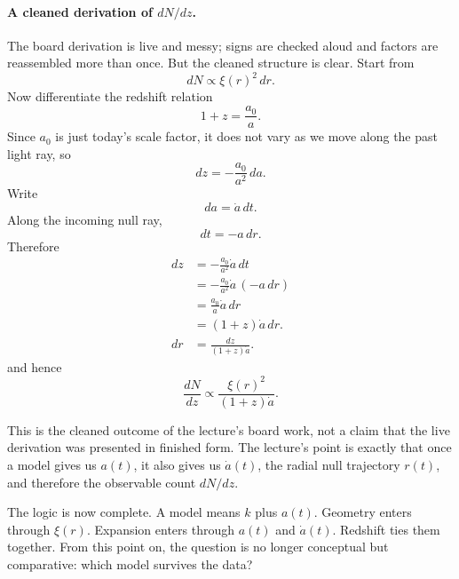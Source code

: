 \paragraph{A cleaned derivation of \(dN/dz\).}
The board derivation is live and messy; signs are checked aloud and factors are reassembled more than once. But the cleaned structure is clear. Start from
\begin{equation}
dN\propto \xi(r)^2\,dr.
\end{equation}
Now differentiate the redshift relation
\begin{equation}
1+z=\frac{a_0}{a}.
\end{equation}
Since \(a_0\) is just today's scale factor, it does not vary as we move along the past light ray, so
\begin{equation}
dz=-\frac{a_0}{a^2}\,da.
\end{equation}
Write
\begin{equation}
da=\dot a\,dt.
\end{equation}
Along the incoming null ray,
\begin{equation}
dt=-a\,dr.
\end{equation}
Therefore
\begin{align}
dz
&=
-\frac{a_0}{a^2}\dot a\,dt
\\
&=
-\frac{a_0}{a^2}\dot a\,(-a\,dr)
\\
&=
\frac{a_0}{a}\dot a\,dr
\\
&=
(1+z)\dot a\,dr.
\\
dr&=\frac{dz}{(1+z)\dot a}.
\end{align}
and hence
\begin{equation}
\frac{dN}{dz}\propto \frac{\xi(r)^2}{(1+z)\dot a}.
\end{equation}

\begin{remark}
This is the cleaned outcome of the lecture's board work, not a claim that the live derivation was presented in finished form. The lecture's point is exactly that once a model gives us \(a(t)\), it also gives us \(\dot a(t)\), the radial null trajectory \(r(t)\), and therefore the observable count \(dN/dz\).
\end{remark}

The logic is now complete. A model means \(k\) plus \(a(t)\). Geometry enters through \(\xi(r)\). Expansion enters through \(a(t)\) and \(\dot a(t)\). Redshift ties them together. From this point on, the question is no longer conceptual but comparative: which model survives the data?


